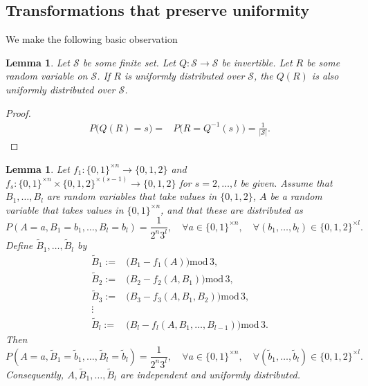 \documentclass[a4paper,aps,floatfix]{revtex4}
\newtheorem{lemma}[theorem]{Lemma}
\begin{document}
\subsection{\label{adfbafnsngs}  Transformations that preserve uniformity}


We make the following basic observation
\begin{lemma}
\label{fnblalnnlba}
Let $\mathcal{S}$ be some finite set. Let $Q:\mathcal{S}\rightarrow\mathcal{S}$ be invertible. Let $R$ be some random variable on $\mathcal{S}$. If $R$ is uniformly distributed over $\mathcal{S}$, the $Q(R)$ is also uniformly distributed over $\mathcal{S}$.
\end{lemma}
\begin{proof}
\begin{equation}
\begin{split}
P\big(Q(R) = s\big) = & P\big(R = Q^{-1}(s)\big) = \frac{1}{|\mathcal{S}|}.
\end{split}
\end{equation}
\end{proof}


\begin{lemma}
\label{mnuzmueeumt} 
Let $f_1:\{0,1\}^{\times n}\rightarrow \{0,1,2\}$ and 
 $f_s:\{0,1\}^{\times n}\times \{0,1,2\}^{\times (s-1)}\rightarrow \{0,1,2\}$ for $s = 2,\ldots, l$ be given. 
Assume that $B_1,\ldots,B_l$ are random variables that take values in $\{0,1,2\}$, $A$ be a random variable that takes values in $\{0,1\}^{\times n}$, and that these are distributed as 
\begin{equation}
\label{fdbdaha}
P(A = a, B_1 = b_1,\ldots, B_l = b_l) = \frac{1}{2^n3^l},\quad\forall a\in \{0,1\}^{\times n},\quad \forall (b_1,\ldots, b_l)\in\{0,1,2\}^{\times l}.
\end{equation}
Define $\tilde{B}_1,\ldots, \tilde{B}_l$ by
\begin{equation}
\label{fgnsfgfgnngf}
\begin{split}
\tilde{B}_1 := &  \big(B_1-f_1(A)\big)\mathrm{mod}\, 3,\\
\tilde{B}_2 := & \big(B_2 - f_2(A, B_1)\big)\mathrm{mod}\, 3,\\
\tilde{B}_3 := & \big(B_3  - f_3(A, B_1,B_2)\big)\mathrm{mod}\, 3,\\
\vdots & \\
\tilde{B}_l := & \big(B_l - f_l(A,B_1,\ldots, B_{l-1})\big)\mathrm{mod}\, 3.
\end{split}
\end{equation}
Then 
\begin{equation}
\label{fgmhmdghm}
P(A = a, \tilde{B}_1 = \tilde{b}_1,\ldots, \tilde{B}_l = \tilde{b}_l) = \frac{1}{2^n3^l},\quad\forall a\in \{0,1\}^{\times n},\quad \forall (\tilde{b}_1,\ldots, \tilde{b}_l)\in\{0,1,2\}^{\times l}.
\end{equation} 
Consequently, $A,\tilde{B}_1,\ldots,\tilde{B}_l$ are independent and uniformly distributed.
\end{lemma}
\end{document}
